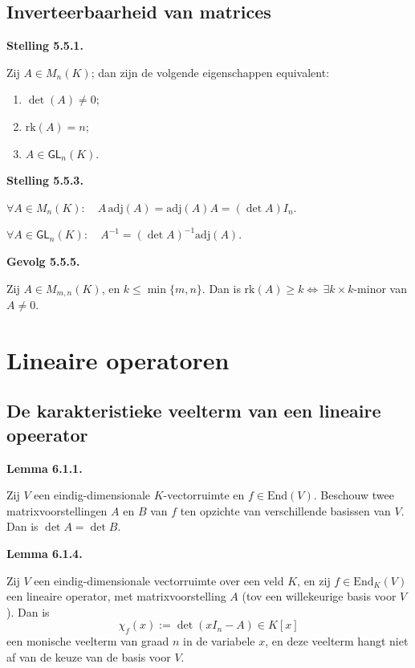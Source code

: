 \documentclass[10pt,a4paper]{article}
\newenvironment{res}[2]{%
  \par\noindent\textbf{#1 #2.}%
}{%
  \par\vspace{2pt}\normalfont
}
\begin{document}
\subsection{Inverteerbaarheid van matrices}
\begin{res}{Stelling}{5.5.1}
Zij $A\in M_n(K)$; dan zijn de volgende eigenschappen equivalent:
\begin{enumerate}[label=(\alph*),leftmargin=1.8em,itemsep=1pt,topsep=1pt]
\item $\det(A)\ne0$;
\item $\mathrm{rk}(A)=n$;
\item $A\in \mathsf{GL}_n(K)$.
\end{enumerate}
\end{res}

\begin{res}{Stelling}{5.5.3}
\begin{myenum}
\item $ \forall A\in M_n(K): \quad A\,\mathrm{adj}(A)=\mathrm{adj}(A)A=(\det A)I_n$.
\item $ \forall A\in \mathsf{GL}_n(K): \quad A^{-1}=(\det A)^{-1}\mathrm{adj}(A)$.
\end{myenum}
\end{res}

\begin{res}{Gevolg}{5.5.5}
Zij $A\in M_{m,n}(K)$, en $k\le\min\{m,n\}$. Dan is $\mathrm{rk}(A)\ge k \iff \, \exists k\times k$-minor van $A \neq 0$.
\end{res}

\section{Lineaire operatoren}
\subsection{De karakteristieke veelterm van een lineaire opeerator}
\begin{res}{Lemma}{6.1.1}
Zij $V$ een eindig-dimensionale $K$-vectorruimte en $f\in\mathrm{End}(V)$. Beschouw twee matrixvoorstellingen $A$ en $B$ van $f$ ten opzichte van verschillende basissen van $V$. Dan is $\det A=\det B$.
\end{res}

\begin{res}{Lemma}{6.1.4}
Zij $V$ een eindig-dimensionale vectorruimte over een veld $K$, en zij $f\in\mathrm{End}_K(V)$ een lineaire operator, met matrixvoorstelling $A$ (tov een willekeurige basis voor $V$). Dan is
\[
\chi_f(x):=\det(xI_n-A)\in K[x]
\]
een monische veelterm van graad $n$ in de variabele $x$, en deze veelterm hangt niet af van de keuze van de basis voor \(V\).
\end{res}
\end{document}
